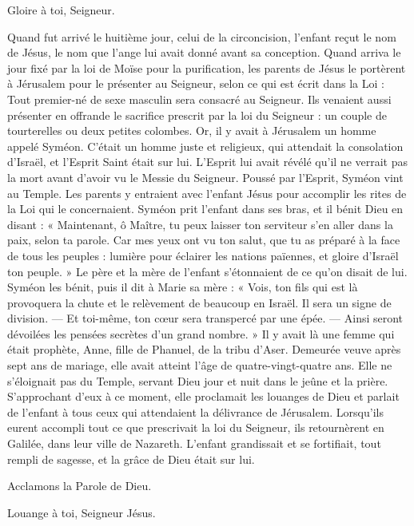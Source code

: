 \rubricatum{\Rbardot{}} Gloire à toi, Seigneur.

Quand fut arrivé le huitième jour, celui de la circoncision, l'enfant reçut
le nom de Jésus, le nom que l'ange lui avait donné avant sa conception.
Quand arriva le jour fixé par la loi de Moïse pour la purification, les
parents de Jésus le portèrent à Jérusalem pour le présenter au Seigneur,
selon ce qui est écrit dans la Loi : Tout premier-né de sexe masculin sera
consacré au Seigneur. Ils venaient aussi présenter en offrande le sacrifice
prescrit par la loi du Seigneur : un couple de tourterelles ou deux petites
colombes. Or, il y avait à Jérusalem un homme appelé Syméon. C'était un
homme juste et religieux, qui attendait la consolation d'Israël, et
l'Esprit Saint était sur lui. L'Esprit lui avait révélé qu'il ne verrait
pas la mort avant d'avoir vu le Messie du Seigneur. Poussé par l'Esprit,
Syméon vint au Temple. Les parents y entraient avec l'enfant Jésus pour
accomplir les rites de la Loi qui le concernaient. Syméon prit l'enfant
dans ses bras, et il bénit Dieu en disant : « Maintenant, ô Maître, tu peux
laisser ton serviteur s'en aller dans la paix, selon ta parole. Car mes
yeux ont vu ton salut, que tu as préparé à la face de tous les peuples :
lumière pour éclairer les nations païennes, et gloire d'Israël ton peuple.
» Le père et la mère de l'enfant s'étonnaient de ce qu'on disait de lui.
Syméon les bénit, puis il dit à Marie sa mère : « Vois, ton fils qui est là
provoquera la chute et le relèvement de beaucoup en Israël. Il sera un
signe de division. — Et toi-même, ton cœur sera transpercé par une épée. —
Ainsi seront dévoilées les pensées secrètes d'un grand nombre. » Il y avait
là une femme qui était prophète, Anne, fille de Phanuel, de la tribu
d'Aser. Demeurée veuve après sept ans de mariage, elle avait atteint l'âge
de quatre-vingt-quatre ans. Elle ne s'éloignait pas du Temple, servant Dieu
jour et nuit dans le jeûne et la prière. S'approchant d'eux à ce moment,
elle proclamait les louanges de Dieu et parlait de l'enfant à tous ceux qui
attendaient la délivrance de Jérusalem. Lorsqu'ils eurent accompli tout ce
que prescrivait la loi du Seigneur, ils retournèrent en Galilée, dans leur
ville de Nazareth. L'enfant grandissait et se fortifiait, tout rempli de
sagesse, et la grâce de Dieu était sur lui.

Acclamons la Parole de Dieu.

\rubricatum{\Rbardot{}} Louange à toi, Seigneur Jésus.
